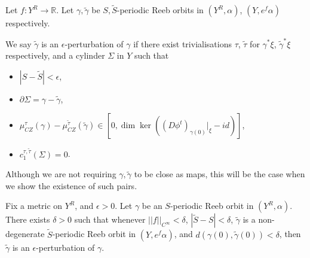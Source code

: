 \documentclass{article}
\numberwithin{equation}{section}
\numberwithin{figure}{section}
\begin{document}
\begin{defn}
    Let $f:Y^R\rightarrow \mathbb{R}$. Let $\gamma,\tilde{\gamma}$ be $S,\tilde{S}$-periodic Reeb orbits in $(Y^R,\alpha)$, $(Y,e^f\alpha)$ respectively.

    We say $\tilde{\gamma}$ is an $\epsilon$-perturbation of ${\gamma}$ if there exist trivialisations $\tau$, $\tilde{\tau}$ for $\gamma^*\xi$, $\tilde{\gamma}^*\xi$ respectively, and a cylinder $\Sigma$ in $Y$ such that 
    \begin{itemize}
    \item $|S-\tilde{S}|<\epsilon$,
    \item $\partial \Sigma=\gamma-\tilde{\gamma}$,
    \item $\mu_{CZ}^\tau(\gamma)-\mu_{CZ}^{\tilde{\tau}}(\tilde{\gamma})\in [0,\dim\ker((D\phi^t)_{\gamma(0)}|_\xi-id)]$,
    \item  $c_1^{\tau,\tilde{\tau}}(\Sigma)=0$.
    \end{itemize}
    Although we are not requiring $\gamma,\tilde{\gamma}$ to be close as maps, this will be the case when we show the existence of such pairs.
\end{defn}
\begin{lem}
\label{single_orbit_perturbation}
Fix a metric on $Y^R$, and $\epsilon>0$. Let $\gamma$ be an $S$-periodic Reeb orbit in $(Y^R,\alpha)$. There exists $\delta>0$ such that whenever $||f||_{C^\infty}<\delta$, $|\tilde{S}-S|<\delta$, $\tilde{\gamma}$ is a non-degenerate $\tilde{S}$-periodic Reeb orbit in $(Y,e^f\alpha)$, and $d(\gamma(0),\tilde{\gamma}(0))<\delta$, then $\tilde{\gamma}$ is an $\epsilon$-perturbation of $\gamma$.
\end{lem}
\end{document}
